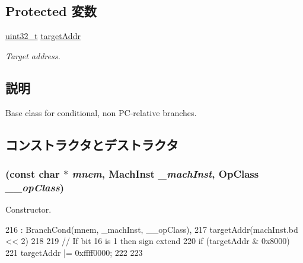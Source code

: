 \subsection*{Protected 変数}
\begin{DoxyCompactItemize}
\item 
\hyperlink{Type_8hh_a435d1572bf3f880d55459d9805097f62}{uint32\_\-t} \hyperlink{classPowerISA_1_1BranchNonPCRelCond_af2e4ceec51be67b8f833e5e205e11ca7}{targetAddr}
\begin{DoxyCompactList}\small\item\em Target address. \item\end{DoxyCompactList}\end{DoxyCompactItemize}


\subsection{説明}
Base class for conditional, non PC-\/relative branches. 

\subsection{コンストラクタとデストラクタ}
\hypertarget{classPowerISA_1_1BranchNonPCRelCond_af2cfe55ddfaf984cdee6e0ac3db83f53}{
\subsubsection[{BranchNonPCRelCond}]{ (const char $\ast$ {\em mnem}, \/  {\bf MachInst} {\em \_\-machInst}, \/  OpClass {\em \_\-\_\-opClass})}}
\label{classPowerISA_1_1BranchNonPCRelCond_af2cfe55ddfaf984cdee6e0ac3db83f53}


Constructor. 


\begin{DoxyCode}
216         : BranchCond(mnem, _machInst, __opClass),
217           targetAddr(machInst.bd << 2)
218     {
219         // If bit 16 is 1 then sign extend
220         if (targetAddr & 0x8000) {
221             targetAddr |= 0xffff0000;
222         }
223     }
\end{DoxyCode}


